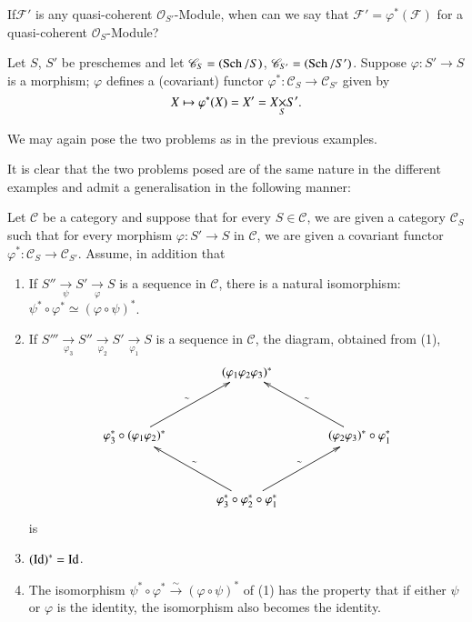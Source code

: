 \begin{problem}
If\pageoriginale $\mathscr{F}'$ is any quasi-coherent
$\mathscr{O}_{S'}$-Module, when can we say that
$\mathscr{F}'=\varphi^{\ast}(\mathscr{F})$ for a 
quasi-coherent $\mathscr{O}_{S}$-Module? 
\end{problem}

\begin{exam}\label{chap7-exam3}
Let $S$, $S'$ be preschemes and let $\mathscr{C}_{S}=(\operatorname{Sch}/S)$,
$\mathscr{C}_{S'}=(\operatorname{Sch}/S')$. Suppose $\varphi:S'\to S$ is a morphism;
$\varphi$ defines a (covariant) functor
$\varphi^{\ast}:\mathscr{C}_{S}\to \mathscr{C}_{S'}$ given by
$$
X\mapsto \varphi^{\ast}(X)=X'=\fprod{X}{S'}{S}.
$$
\end{exam}

We may again pose the two problems as in the previous examples. 

It is clear that the two problems posed are of the same nature in the
different examples and admit a generalisation in the following manner:

Let $\mathscr{C}$ be a category and suppose that for every $S\in
\mathscr{C}$, we are given a category $\mathscr{C}_{S}$ such that for
every morphism $\varphi:S'\to S$ in $\mathscr{C}$, we are given a
covariant functor $\varphi^{\ast}:\mathscr{C}_{S}\to
\mathscr{C}_{S'}$. Assume, in addition that
\begin{enumerate}
\renewcommand{\labelenumi}{(\theenumi)}
\item If $S''\xrightarrow[\psi]{}S'\xrightarrow[\varphi]{}S$ is a
  sequence in $\mathscr{C}$, there is a natural isomorphism:
  $\psi^{\ast}\circ \varphi^{\ast}\simeq (\varphi\circ\psi)^{\ast}$. 

\item If
  $S'''\xrightarrow[\varphi_{3}]{}S''\xrightarrow[\varphi_{2}]{}S'\xrightarrow[\varphi_{1}]{}S$
  is a sequence in $\mathscr{C}$, the diagram, obtained from (1),
\[
\xymatrix@=1.2cm{
 & (\varphi_{1}\varphi_{2}\varphi_{3})^{\ast} &\\
\varphi^{\ast}_{3}\circ(\varphi_{1}\varphi_{2})^{\ast}\ar[ur]^{\sim} &
& (\varphi_{2}\varphi_{3})^{\ast}\circ
\varphi^{\ast}_{1}\ar[ul]_{\sim}\\
 & \varphi^{\ast}_{3}\circ\varphi^{\ast}_{2}\circ
\varphi^{\ast}_{1}\ar[ul]_{\sim}\ar[ur]^{\sim} &
}
\]
is

\item $(\operatorname{Id})^{\ast}=\operatorname{Id}$. 

\item The isomorphism
  $\psi^{\ast}\circ\varphi^{\ast}\xrightarrow{\sim} (\varphi\circ
  \psi)^{\ast}$ of (1) has the property that if either $\psi$ or
  $\varphi$ is the identity, the isomorphism also becomes the identity.
\end{enumerate}

